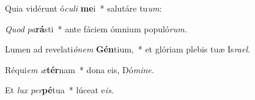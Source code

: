 \item Quia vidérunt ó\textit{culi} \textbf{me}i~* salutáre tu\textit{um}:
\item \textit{Quod} \textit{pa}\textbf{rá}sti~* ante fáciem ó\-mnium populó\textit{rum.}
\item Lumen ad revelati\textit{ónem} \textbf{Gén}tium,~* et glóriam plebis tuæ Is\textit{rael.}
\item Réqui\tinyhspace\textit{em} \textit{æ}\textbf{tér}nam~* dona eis, Dó\textit{mine.}
\item Et \textit{lux} \textit{per}\textbf{pé}tua~* lúceat e\tinyhspace\textit{is.}